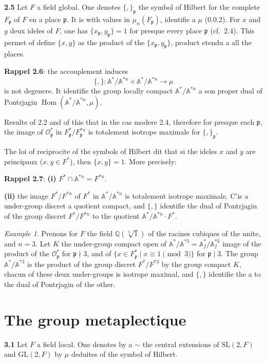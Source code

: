 \documentclass[12pt,a4paper]{article}
\theoremstyle{plain}
\theoremstyle{definition}
\theoremstyle{remark}
\newtheorem{example}[theorem]{Example}
\DeclareMathOperator{\Hom}{Hom}
\newcommand{\QQ}{\mathbb{Q}}
\newcommand{\Af}{\mathbb{A}}
\newcommand{\cO}{\mathcal{O}}
\newcommand{\frakp}{\mathfrak{p}}
\providecommand{\QQ}{\mathbb{Q}}
\providecommand{\cO}{\mathcal{O}}
\providecommand{\frakp}{\mathfrak{p}}
\providecommand{\Hom}{\operatorname{Hom}}
\begin{document}
\textbf{2.5} Let $F$ a field global. One denotes $\{,\}_\frakp$ the symbol of Hilbert for the complete $F_\frakp$ of $F$ en a place $\frakp$. It is with values in $\mu_n(F_\frakp)$, identifie a $\mu$ (0.0.2). For $x$ and $y$ deux ideles of $F$, one has $\{x_\frakp, y_\frakp\} = 1$ for presque every place $\frakp$ (cf.\ 2.4). This permet of define $\{x, y\}$ as the product of the $\{x_\frakp, y_\frakp\}$, product etendu a all the places.

\textbf{Rappel 2.6}: the accouplement induces
\[
\{,\} : \Af^*/\Af^{*n} \times \Af^*/\Af^{*n} \longrightarrow \mu
\]
is not degenere. It identifie the group locally compact $\Af^*/\Af^{*n}$ a son proper dual of Pontrjagin $\Hom(\Af^*/\Af^{*n}, \mu)$.

Resulte of 2.2 and of this that in the cas modere 2.4, therefore for presque each $\frakp$, the image of $\cO_\frakp^*$ in $F_\frakp^*/F_\frakp^{*n}$ is totalement isotrope maximale for $\{,\}_\frakp$.

The loi of reciprocite of the symbols of Hilbert dit that si the ideles $x$ and $y$ are principaux ($x, y \in F^*$), then $\{x, y\} = 1$. More precisely:

\textbf{Rappel 2.7}: \textbf{(i)} $F^* \cap \Af^{*n} = F^{*n}$.

\textbf{(ii)} the image $F^*/F^{*n}$ of $F^*$ in $\Af^*/\Af^{*n}$ is totalement isotrope maximale. C'is a under-group discret a quotient compact, and $\{,\}$ identifie the dual of Pontrjagin of the group discret $F^*/F^{*n}$ to the quotient $\Af^*/\Af^{*n} \cdot F^*$.

\begin{example}
Prenons for $F$ the field $\QQ(\sqrt[3]{1})$ of the racines cubiques of the unite, and $n = 3$. Let $K$ the under-group compact open of $\Af^*/\Af^{*3} = \Af_f^*/\Af_f^{*3}$ image of the product of the $\cO_\frakp^*$ for $\frakp \nmid 3$, and of $\{x \in F_\frakp^* \mid x \equiv 1 \pmod 3\}$ for $\frakp \mid 3$. The group $\Af^*/\Af^{*3}$ is the product of the group discret $F^*/F^{*3}$ by the group compact $K$, chacun of these deux under-groups is isotrope maximal, and $\{,\}$ identifie the a to the dual of Pontrjagin of the other.
\end{example}

\section{The group metaplectique}

\textbf{3.1} Let $F$ a field local. One denotes by a $\sim$ the central extensions of $\mathrm{SL}(2, F)$ and $\mathrm{GL}(2, F)$ by $\mu$ deduites of the symbol of Hilbert.
\end{document}
